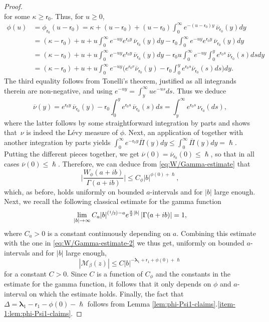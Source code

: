 \documentclass[10pt]{amsart}
\newcommand{\Psfrac}[2]{(\sfrac{#1}{#2})}
\theoremstyle{plain}
\theoremstyle{definition}
\newcommand{\calM}{\mathcal{M}}
\newcommand{\lam}{{\bm{\lambda}_1}}
\newcommand{\tet}{{\mathsf{r}_0}}
\newcommand{\vat}{{\mathsf{r}_1}}
\let\h\hslash
\let\bpsi\beta
\begin{document}
\begin{proof}
\begin{equation*}
\end{equation*}
for some $\kappa \geq \tet$. Thus, for $u \geq 0$,
\begin{align*}
\phi(u) &= \phi_{\tet}(u-\tet) = \kappa+(u-\tet)+(u-\tet)\int_0^\infty e^{-(u-\tet)y}\, \overline{\nu}_{\tet}(y)dy \\
&= (\kappa-\tet) + u + u \int_0^\infty e^{-uy} e^{\tet y}\,\overline{\nu}_{\tet}(y)dy -\tet \int_0^\infty e^{-uy}e^{\tet y}\, \overline{\nu}_{\tet}(y)dy \\
&= (\kappa-\tet) + u + u \int_0^\infty e^{-uy} e^{\tet y}\,\overline{\nu}_{\tet}(y)dy -\tet u \int_0^\infty e^{-uy} \int_0^y e^{\tet s}\, \overline{\nu}_{\tet}(s)ds dy \\
&= (\kappa-\tet) + u + u \int_0^\infty e^{-uy} \biggl( e^{\tet r}\overline{\nu}_{\tet}(y) - \tet\int_0^y e^{\tet s} \overline{\nu}_{\tet}(s)ds\biggr)dy.
\end{align*}
The third equality follows from Tonelli's theorem, justified as all integrands therein are non-negative, and using $e^{-uy} = \int_y^\infty ue^{-us} ds$. Thus we deduce
\begin{equation*}
\overline{\nu}(y) = e^{\tet y}\,\overline{\nu}_\tet(y) -\tet\int_0^y e^{\tet s}\, \overline{\nu}_\tet(s)ds = \int_y^\infty e^{\tet s}\,\nu_\tet(ds),
\end{equation*}
where the latter follows by some straightforward integration by parts and shows that~$\nu$ is indeed the Lévy measure of $\phi$. Next, an application of \cite[Prop.\,4.1(9)]{Patie-Savov-GeL} together with another integration by parts yields $\int_0^\infty e^{-\tet y} \overline{\Pi}(y)dy \leq \int_0^\infty \overline{\Pi}(y)dy = \h$. Putting the different pieces together, we get $\overline{\nu}(0) = \overline{\nu}_\tet(0) \leq \h$, so that in all cases $\overline{\nu}(0) \leq \h$. Therefore, we can deduce from \eqref{eq:W/Gamma-estimate} that
\begin{equation}
\label{eq:W/Gamma-estimate-2}
\biggl| \frac{W_\phi(a+ib)}{\Gamma(a+ib)}\biggr| \leq C_\phi |b|^{\phi(0)+\h},
\end{equation}
which, as before, holds uniformly on bounded $a$-intervals and for $|b|$ large enough. Next, we recall the following classical estimate for the gamma function
\begin{equation}
\label{eq:classical-Gamma}
\lim_{|b| \to \infty} C_a|b|^{\Psfrac{1}{2}-a} e^{\frac{\pi}{2}|b|} \left|\Gamma(a+ib)\right| =1,
\end{equation}
where $C_a > 0$ is a constant continuously depending on $a$. Combining this estimate with the one in \eqref{eq:W/Gamma-estimate-2} we thus get, uniformly on bounded $a$-intervals and for $|b|$ large enough,
\begin{equation*}
\left|\calM_\bpsi(z)\right| \leq C|b|^{-\lam+\vat + \phi(0) + \h}
\end{equation*}
for a constant $C > 0$. Since $C$ is a function of $C_\phi$ and the constants in the estimate for the gamma function, it follows that it only depends on $\phi$ and $a$-interval on which the estimate holds. Finally, the fact that $\Delta = \lam-\vat-\phi(0)- \h$ follows from Lemma \ref{lem:phi-Psi1-claims}.\eqref{item-1:lem:phi-Psi1-claims}.
\end{proof}
\end{document}

